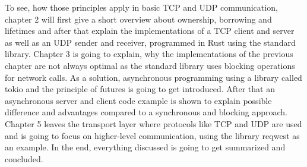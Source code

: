 To see, how those principles apply in basic TCP and UDP communication, chapter 2 will first give a short overview about
ownership, borrowing and lifetimes and after that explain the implementations of a TCP client and server as well as an
UDP sender and receiver, programmed in Rust using the standard library. Chapter 3 is going to explain, why the
implementations of the previous chapter are not always optimal as the standard library uses blocking operations for
network calls. As a solution, asynchronous programming using a library called tokio and the principle of futures is
going to get introduced. After that an asynchronous server and client code example is shown to explain possible
difference and advantages compared to a synchronous and blocking approach. Chapter 5 leaves the transport layer where
protocols like TCP and UDP are used and is going to focus on higher-level communication, using the library reqwest as
an example. In the end, everything discussed is going to get summarized and concluded.
